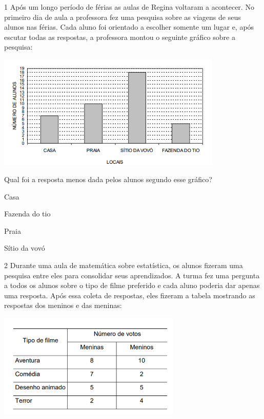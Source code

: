 
\num{1} Após um longo período de férias as aulas de Regina voltaram a acontecer.
No primeiro dia de aula a professora fez uma pesquisa sobre as viagens de seus alunos nas férias. Cada aluno foi
orientado a escolher somente um lugar e, após escutar todas as respostas,
a professora montou o seguinte gráfico sobre a pesquisa:

\includegraphics[width=4.23077in,height=2.15071in]{./media/image92.png}

Qual foi a resposta menos dada pelos alunos segundo esse gráfico?

\begin{minipage}{.5\textwidth}
\begin{escolha}
\item
  Casa
\item
  Fazenda do tio
\item
  Praia
\item
  Sítio da vovó
\end{escolha}
\end{minipage}

\num{2} Durante uma aula de matemática sobre estatística, os alunos fizeram uma
pesquisa entre eles para consolidar seus aprendizados. A turma fez uma
pergunta a todos os alunos sobre o tipo de filme preferido e cada aluno
poderia dar apenas uma resposta. Após essa coleta de respostas, eles
fizeram a tabela mostrando as respostas dos meninos e das
meninas:

\includegraphics[width=3.42308in,height=1.97646in]{./media/image93.png}

